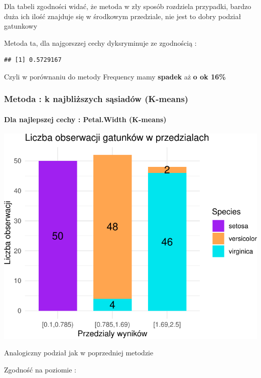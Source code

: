 \documentclass[
  12pt,
]{article}
\begin{document}
Dla tabeli zgodności widać, że metoda w zły sposób rozdziela przypadki,
bardzo duża ich ilość znajduje się w środkowym przedziale, nie jest to
dobry podział gatunkowy

Metoda ta, dla najgorszzej cechy dyksryminuje ze zgodnością :

\begin{verbatim}
## [1] 0.5729167
\end{verbatim}

Czyli w porównaniu do metody Frequency mamy \textbf{spadek} aż \textbf{o
ok 16\%}

\subsubsection{Metoda : k najbliższych sąsiadów
(K-means)}\label{metoda-k-najbliux17cszych-sux105siaduxf3w-k-means}

\paragraph{Dla najlepszej cechy : Petal.Width
(K-means)}\label{dla-najlepszej-cechy-petal.width-k-means}

\begin{center}\includegraphics{Sprawozdanie2_files/figure-latex/tabela_kondygnacji_3_najl-1} \end{center}

Analogiczny podział jak w poprzedniej metodzie

Zgodność na poziomie :
\end{document}
